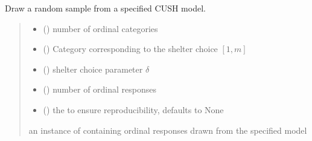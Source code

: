 \documentclass[letterpaper,10pt,english]{sphinxmanual}
\begin{document}
\begin{fulllineitems}
\label{\detokenize{cubmods:cubmods.cush.draw}}
\pysigstartsignatures
{}
\pysigstopsignatures
\sphinxAtStartPar
Draw a random sample from a specified CUSH model.
\begin{quote}\begin{description}
\begin{itemize}
\item {} 
\sphinxAtStartPar
{} () \textendash{} number of ordinal categories

\item {} 
\sphinxAtStartPar
{} () \textendash{} Category corresponding to the shelter choice \([1,m]\)

\item {} 
\sphinxAtStartPar
{} () \textendash{} shelter choice parameter \(\delta\)

\item {} 
\sphinxAtStartPar
{} () \textendash{} number of ordinal responses

\item {} 
\sphinxAtStartPar
{} (\sphinxstyleliteralemphasis{\sphinxupquote{, }}) \textendash{} the  to ensure reproducibility, defaults to None

\end{itemize}

\sphinxAtStartPar
an instance of  containing ordinal responses drawn from the specified model

\end{description}\end{quote}

\end{fulllineitems}
\end{document}

